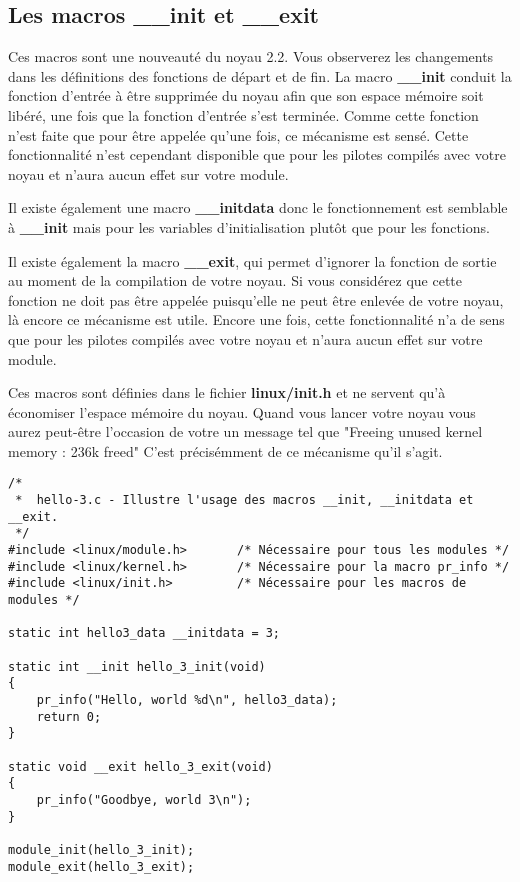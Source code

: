 \documentclass[11pt]{article}
\begin{document}
\subsection*{Les macros \_\_init et \_\_exit}
\label{sec-4-3}

Ces macros sont une nouveauté du noyau 2.2. Vous observerez les changements dans les définitions des fonctions de départ et de fin. La macro \textbf{\_\_init} conduit la fonction d'entrée à être supprimée du noyau afin que son espace mémoire soit libéré, une fois que la fonction d'entrée s'est terminée. Comme cette fonction n'est faite que pour être appelée qu'une fois, ce mécanisme est sensé. Cette fonctionnalité n'est cependant disponible que pour les pilotes compilés avec votre noyau et n'aura aucun effet sur votre module.

Il existe également une macro \textbf{\_\_initdata} donc le fonctionnement est semblable à \textbf{\_\_init} mais pour les variables d'initialisation plutôt que pour les fonctions.

Il existe également la macro \textbf{\_\_exit}, qui permet d'ignorer la fonction de sortie au moment de la compilation de votre noyau. Si vous considérez que cette fonction ne doit pas être appelée puisqu'elle ne peut être enlevée de votre noyau, là encore ce mécanisme est utile. Encore une fois, cette fonctionnalité n'a de sens que pour les pilotes compilés avec votre noyau et n'aura aucun effet sur votre module.

Ces macros sont définies dans le fichier \textbf{linux/init.h} et ne servent qu'à économiser l'espace mémoire du noyau. Quand vous lancer votre noyau vous aurez peut-être l'occasion de votre un message tel que "Freeing unused kernel memory : 236k freed" C'est précisémment de ce mécanisme qu'il s'agit.


\begin{verbatim}
/*
 *  hello-3.c - Illustre l'usage des macros __init, __initdata et __exit.
 */
#include <linux/module.h>       /* Nécessaire pour tous les modules */
#include <linux/kernel.h>       /* Nécessaire pour la macro pr_info */
#include <linux/init.h>         /* Nécessaire pour les macros de modules */

static int hello3_data __initdata = 3;

static int __init hello_3_init(void)
{
    pr_info("Hello, world %d\n", hello3_data);
    return 0;
}

static void __exit hello_3_exit(void)
{
    pr_info("Goodbye, world 3\n");
}

module_init(hello_3_init);
module_exit(hello_3_exit);
\end{verbatim}
\end{document}
